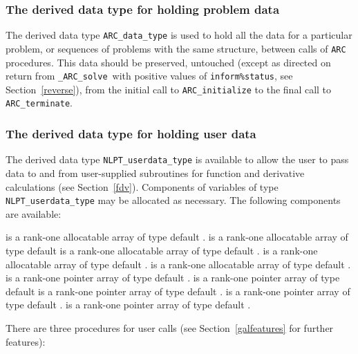 \documentclass{galahad}
\newcommand{\packagename}{ARC}
\newcommand{\fullpackagename}{\libraryname\_\packagename}
\newcommand{\solver}{{\tt \fullpackagename\_solve}}
\begin{document}

\subsubsection{The derived data type for holding problem data}\label{typedata}
The derived data type
{\tt \packagename\_data\_type}
is used to hold all the data for a particular problem,
or sequences of problems with the same structure, between calls of
{\tt \packagename} procedures.
This data should be preserved, untouched (except as directed on
return from \solver\ with positive values of {\tt inform\%status}, see
Section~\ref{reverse}),
from the initial call to
{\tt \packagename\_initialize}
to the final call to
{\tt \packagename\_terminate}.


\subsubsection{The derived data type for holding user data}\label{typeuserdata}
The derived data type
{\tt NLPT\_userdata\_type}
is available to allow the user to pass data to and from user-supplied
subroutines for function and derivative calculations (see Section~\ref{fdv}).
Components of variables of type {\tt NLPT\_userdata\_type} may be allocated as
necessary. The following components are available:

\begin{description}
 is a rank-one allocatable array of type default \integer.
 is a rank-one allocatable array of type default  \realdp
{} is a rank-one allocatable array of type default \complexdp.
 is a rank-one allocatable array of type default \character.
 is a rank-one allocatable array of type default \logical.
 is a rank-one pointer array of type default \integer.
 is a rank-one pointer array of type default  \realdp
{} is a rank-one pointer array of type default \complexdp.
 is a rank-one pointer array of type default \character.
 is a rank-one pointer array of type default \logical.
\end{description}


\galarguments
There are three procedures for user calls
(see Section~\ref{galfeatures} for further features):
\end{document}
